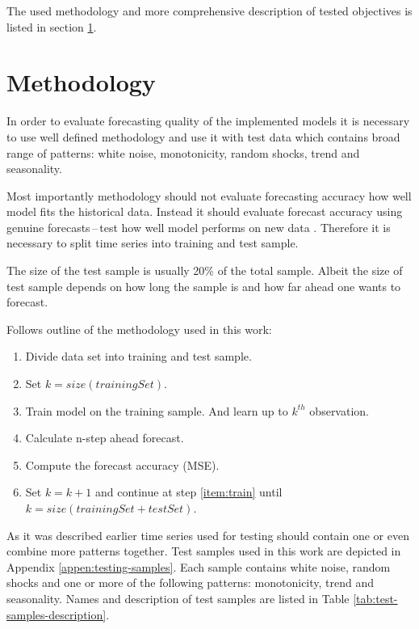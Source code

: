 The used methodology and more comprehensive description of tested objectives is listed in section \ref{sec:methodology}.

    \section{Methodology} \label{sec:methodology}
    In order to evaluate forecasting quality of the implemented models it is necessary to use well defined
    methodology and use it with test data which contains broad range of patterns: white noise, monotonicity, random
    shocks, trend and seasonality.

    Most importantly methodology should not evaluate forecasting accuracy how well model
    fits the historical data. Instead it should evaluate forecast accuracy using genuine forecasts\,--\,test 
    how well model performs on new data \cite{otexts}. Therefore it is necessary to split time series into training
    and test sample.

    The size of the test sample is usually 20\% of the total sample. Albeit the size of test sample depends on how
    long the sample is and how far ahead one wants to forecast.

    Follows outline of the methodology used in this work:
    \begin{enumerate} \label{enum:methodology}
        \item Divide data set into training and test sample.
        \item Set $k = size(trainingSet)$.
        \item Train model on the training sample. And learn up to $k^{th}$ observation. \label{item:train}
        \item Calculate n-step ahead forecast.
        \item Compute the forecast accuracy (MSE).
        \item Set $k = k+1$ and continue at step \ref{item:train} until $k=size(trainingSet + testSet)$.
    \end{enumerate}

    As it was described earlier time series used for testing should contain one or even combine more patterns together.
    Test samples used in this work are depicted in Appendix \ref{appen:testing-samples}. Each sample contains white
    noise, random shocks and one or more of the following patterns: monotonicity, trend and seasonality. Names and
    description of test samples are listed in Table \ref{tab:test-samples-description}.

